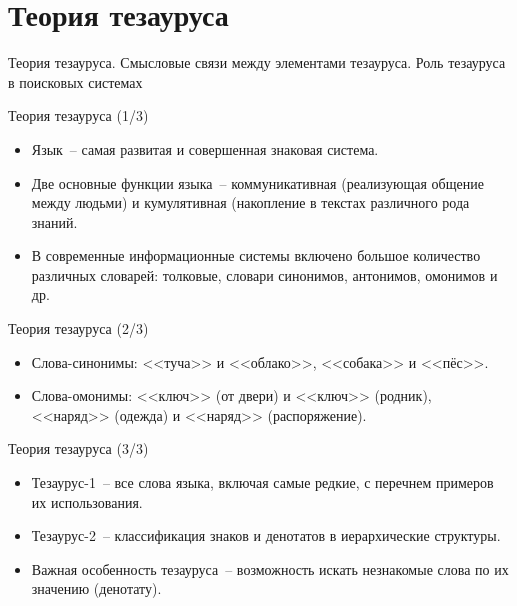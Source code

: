 \documentclass[aspectratio=169]{beamer}
\begin{document}
\section{Теория тезауруса}

\begin{frame}
\begin{center}
  \Huge{Теория тезауруса. Смысловые связи между элементами тезауруса. Роль тезауруса в поисковых системах}
\end{center}
\end{frame}

\begin{frame}{Теория тезауруса (1/3)}
  \begin{itemize}
  \item {
    Язык~-- самая развитая и совершенная знаковая система.
  }
  \item {
    Две основные функции языка~-- коммуникативная (реализующая общение между людьми) и кумулятивная (накопление в текстах различного рода знаний.
  }
  \item {
    В современные информационные системы включено большое количество различных словарей: толковые, словари синонимов, антонимов, омонимов и др.
  }
  \end{itemize}
\end{frame}

\begin{frame}{Теория тезауруса (2/3)}
  \begin{itemize}
  \item {
    Слова-синонимы: <<туча>> и <<облако>>, <<собака>> и <<пёс>>.
  }
  \item {
    Слова-омонимы: <<ключ>> (от двери) и <<ключ>> (родник), <<наряд>> (одежда) и <<наряд>> (распоряжение).
  }
  \end{itemize}
\end{frame}

\begin{frame}{Теория тезауруса (3/3)}
  \begin{itemize}
  \item {
    Тезаурус-1~-- все слова языка, включая самые редкие, с перечнем примеров их использования.
  }
  \item {
    Тезаурус-2~-- классификация знаков и денотатов в иерархические структуры.
  }
  \item {
    Важная особенность тезауруса~-- возможность искать незнакомые слова по их значению (денотату).
  }
  \end{itemize}
\end{frame}
\end{document}

